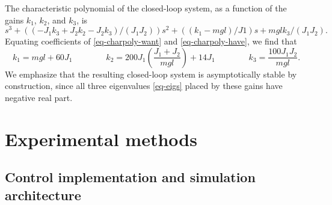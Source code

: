 \documentclass[conf]{new-aiaa}
\begin{document}
The characteristic polynomial of the closed-loop system, as a function of the gains $k_{1}$, $k_{2}$, and $k_{3}$, is
\begin{equation}
s^{3} + \left((-J_{1}k_{3} + J_{2}k_{2} - J_{2}k_{3})/(J_{1}J_{2})\right)s^{2} + \left((k_{1}-mgl)/J1\right)s + mglk_{3}/(J_{1}J_{2}).
\label{eq-charpoly-have}
\end{equation}
Equating coefficients of \eqref{eq-charpoly-want} and \eqref{eq-charpoly-have}, we find that
\begin{equation}
k_{1} = mgl + 60J_{1}
\qquad\qquad
k_{2} = 200J_{1}\left(\frac{J_{1} + J_{2}}{mgl} \right) + 14J_{1}
\qquad\qquad
k_{3} = \frac{100J_{1}J_{2}}{mgl}.
\end{equation}
We emphasize that the resulting closed-loop system is asymptotically stable by construction, since all three eigenvalues \eqref{eq-eigs} placed by these gains have negative real part.





\section{Experimental methods}
\label{sec-methods}

\subsection{Control implementation and simulation architecture}
\end{document}
